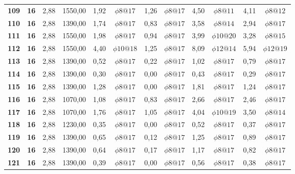 \begin{table}[H]
{\begin{tabular}{|c|c|c|c|c|c|c|c|c|c|c|c|}
        \textbf{109} & \textbf{16} & 2,88  & 1550,00 & 1,92  & $\phi8@17$ & 1,26  & $\phi8@17$ & 4,50  & $\phi8@11$ & 4,11  & $\phi8@12$ \\
        \textbf{110} & \textbf{16} & 2,88  & 1390,00 & 1,74  & $\phi8@17$ & 0,83  & $\phi8@17$ & 3,58  & $\phi8@14$ & 2,94  & $\phi8@17$ \\
        \textbf{111} & \textbf{16} & 2,88  & 1550,00 & 1,98  & $\phi8@17$ & 0,94  & $\phi8@17$ & 3,99  & $\phi10@20$ & 3,28  & $\phi8@15$ \\
        \textbf{112} & \textbf{16} & 2,88  & 1550,00 & 4,40  & $\phi10@18$ & 1,25  & $\phi8@17$ & 8,09  & $\phi12@14$ & 5,94  & $\phi12@19$ \\
        \textbf{113} & \textbf{16} & 2,88  & 1390,00 & 0,52  & $\phi8@17$ & 0,22  & $\phi8@17$ & 1,02  & $\phi8@17$ & 0,79  & $\phi8@17$ \\
        \textbf{114} & \textbf{16} & 2,88  & 1390,00 & 0,30  & $\phi8@17$ & 0,00  & $\phi8@17$ & 0,43  & $\phi8@17$ & 0,29  & $\phi8@17$ \\
        \textbf{115} & \textbf{16} & 2,88  & 1390,00 & 1,28  & $\phi8@17$ & 0,00  & $\phi8@17$ & 1,81  & $\phi8@17$ & 1,24  & $\phi8@17$ \\
        \textbf{116} & \textbf{16} & 2,88  & 1070,00 & 1,08  & $\phi8@17$ & 0,83  & $\phi8@17$ & 2,66  & $\phi8@17$ & 2,46  & $\phi8@17$ \\
        \textbf{117} & \textbf{16} & 2,88  & 1070,00 & 1,76  & $\phi8@17$ & 1,05  & $\phi8@17$ & 4,04  & $\phi10@19$ & 3,50  & $\phi8@14$ \\
        \textbf{118} & \textbf{16} & 2,88  & 1230,00 & 0,35  & $\phi8@17$ & 0,00  & $\phi8@17$ & 0,52  & $\phi8@17$ & 0,37  & $\phi8@17$ \\
        \textbf{119} & \textbf{16} & 2,88  & 1390,00 & 0,65  & $\phi8@17$ & 0,12  & $\phi8@17$ & 1,25  & $\phi8@17$ & 0,89  & $\phi8@17$ \\
        \textbf{120} & \textbf{16} & 2,88  & 1390,00 & 0,64  & $\phi8@17$ & 0,17  & $\phi8@17$ & 1,17  & $\phi8@17$ & 0,82  & $\phi8@17$ \\
        \textbf{121} & \textbf{16} & 2,88  & 1390,00 & 0,39  & $\phi8@17$ & 0,00  & $\phi8@17$ & 0,56  & $\phi8@17$ & 0,38  & $\phi8@17$ \bigstrut[b]\\
        \hline
        \end{tabular}%
        }
      \label{resumenlosas1}%
    \end{table}%
    
